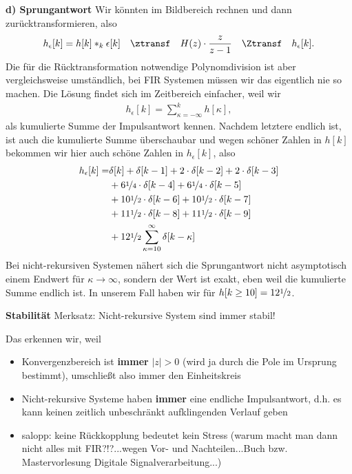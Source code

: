 \begin{ExCalc}
\textbf{d) Sprungantwort}
Wir könnten im Bildbereich rechnen und dann zurücktransformieren, also
\begin{align}
h_\epsilon[k] = h[k]\ast_k \epsilon[k] \quad\ztransf\quad
H(z) \cdot \frac{z}{z-1} \quad\Ztransf\quad h_\epsilon[k].
\end{align}
Die für die Rücktransformation notwendige Polynomdivision ist aber
vergleichsweise umständlich, bei FIR Systemen müssen wir das eigentlich nie so
machen.
%
Die Lösung findet sich im Zeitbereich einfacher, weil wir
\begin{align}
h_\epsilon[k] = \sum_{\kappa=-\infty}^{k} h[\kappa],
\end{align}
als kumulierte Summe der Impulsantwort kennen. Nachdem letztere endlich ist,
ist auch die kumulierte Summe überschaubar und wegen schöner Zahlen in $h[k]$
bekommen wir hier auch schöne Zahlen in $h_\epsilon[k]$, also
\begin{align}
h_\epsilon[k] =
&\delta[k]
+\delta[k-1]
+2\cdot\delta[k-2]
+2\cdot\delta[k-3]\nonumber\\
&+6\nicefrac{1}{4}\cdot\delta[k-4]
+6\nicefrac{1}{4}\cdot\delta[k-5]\nonumber\\
&+10\nicefrac{1}{2}\cdot\delta[k-6]
+10\nicefrac{1}{2}\cdot\delta[k-7]\nonumber\\
&+11\nicefrac{1}{2}\cdot\delta[k-8]
+11\nicefrac{1}{2}\cdot\delta[k-9]\nonumber\\
&+12\nicefrac{1}{2}\sum_{\kappa=10}^{\infty}\delta[k-\kappa]
\end{align}
Bei nicht-rekursiven Systemen nähert sich die Sprungantwort nicht
asymptotisch einem Endwert für $\kappa\to\infty$, sondern der Wert ist exakt,
eben weil die kumulierte Summe endlich ist. In unserem Fall haben wir für
$h[k\geq 10] = 12\nicefrac{1}{2}$.

\textbf{Stabilität}
Merksatz: Nicht-rekursive System sind immer stabil!

Das erkennen wir, weil
\begin{itemize}
  \item Konvergenzbereich ist \textbf{immer} $|z|>0$ (wird ja durch die Pole im Ursprung bestimmt), umschließt also immer den Einheitskreis
  \item Nicht-rekursive Systeme haben \textbf{immer} eine endliche Impulsantwort, d.h. es kann keinen zeitlich unbeschränkt aufklingenden Verlauf geben
  \item salopp: keine Rückkopplung bedeutet kein Stress (warum macht man dann nicht alles mit FIR?!?...wegen Vor- und Nachteilen...Buch bzw. Mastervorlesung Digitale Signalverarbeitung...)
\end{itemize}



\end{ExCalc}
\begin{Loesung}
\end{Loesung}

